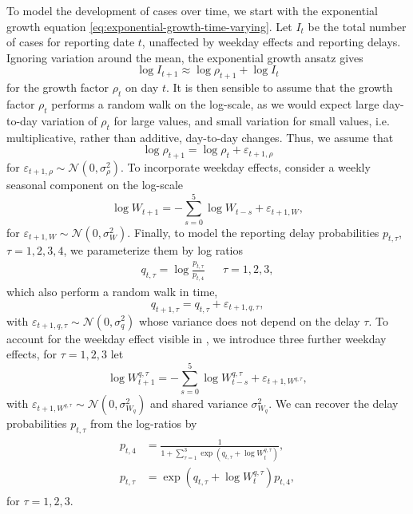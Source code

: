 To model the development of cases over time, we start with the exponential growth equation \eqref{eq:exponential-growth-time-varying}. Let $I_{t}$ be the total number of cases for reporting date $t$, unaffected by weekday effects and reporting delays. Ignoring variation around the mean, the exponential growth ansatz gives 
$$
    \log I_{t + 1} \approx \log \rho_{t + 1}  + \log I_{t}
$$
for the growth factor $\rho_{t}$ on day $t$. It is then sensible to assume that the growth factor $\rho_{t}$ performs a random walk on the log-scale, as we would expect large day-to-day variation of $\rho_{t}$ for large values, and small variation for small values, i.e. multiplicative, rather than additive, day-to-day changes. Thus, we assume that 
$$
    \log \rho_{t + 1} = \log \rho_{t} + \varepsilon_{t + 1, \rho}
$$
for $\varepsilon_{t + 1,\rho} \sim \mathcal N(0, \sigma^{2}_\rho)$. To incorporate weekday effects, consider a weekly seasonal component on the log-scale 
$$
    \log W_{t + 1} = - \sum_{s = 0}^{5} \log W_{t - s} + \varepsilon_{t + 1, W},
$$
for $\varepsilon_{t + 1, W} \sim \mathcal N(0, \sigma^{2}_{W})$. Finally, to model the reporting delay probabilities $p_{t,\tau}$, $\tau = 1,2,3,4$, we parameterize them by log ratios
\begin{align*}
    q_{t, \tau} = \log \frac{p_{t,\tau}}{p_{t,4}} && \tau = 1, 2, 3,
\end{align*}
which also perform a random walk in time, 
$$
    q_{t + 1, \tau} = q_{t, \tau} + \varepsilon_{t+1, q, \tau},
$$
with $\varepsilon_{t + 1, q, \tau} \sim \mathcal N(0, \sigma^{2}_{q})$ whose variance does not depend on the delay $\tau$. To account for the weekday effect visible in , we introduce three further weekday effects, for $\tau = 1,  2, 3$ let
$$
    \log W^{q,\tau}_{t + 1} = - \sum_{s = 0}^{5} \log W^{q,\tau}_{t - s} + \varepsilon_{t + 1, W^{q,\tau}},
$$
with $\varepsilon_{t+1, W^{q,\tau}} \sim \mathcal N \left( 0, \sigma^{2}_{W_q} \right)$ and shared variance $\sigma^{2}_{W_{q}}$.
We can recover the delay probabilities $p_{t, \tau}$ from the log-ratios by 
\begin{align}
    \begin{split}
        \label{eq:p-from-log-ratios}
    p_{t, 4} &= \frac{1}{1 + \sum_{\tau = 1}^3 \exp \left( q_{t,\tau} + \log W^{q,\tau}_{t} \right)}, \\
    p_{t, \tau} &= \exp\left( q_{t, \tau} + \log W^{q, \tau}_{t} \right) p_{t, 4},
    \end{split}
\end{align}
for $\tau = 1, 2, 3$.

